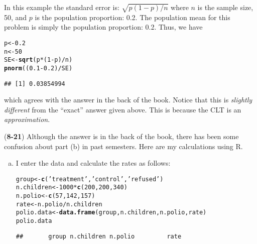 \documentclass[addpoints,12pt]{exam}\usepackage[]{graphicx}\usepackage[]{color}
\makeatletter
\newcommand{\hlnum}[1]{\textcolor[rgb]{0.686,0.059,0.569}{#1}}%
\newcommand{\hlstr}[1]{\textcolor[rgb]{0.192,0.494,0.8}{#1}}%
\newcommand{\hlopt}[1]{\textcolor[rgb]{0,0,0}{#1}}%
\newcommand{\hlstd}[1]{\textcolor[rgb]{0.345,0.345,0.345}{#1}}%
\newcommand{\hlkwb}[1]{\textcolor[rgb]{0.69,0.353,0.396}{#1}}%
\newcommand{\hlkwd}[1]{\textcolor[rgb]{0.737,0.353,0.396}{\textbf{#1}}}%
\newenvironment{kframe}{%
 \def\at@end@of@kframe{}%
 \ifinner\ifhmode%
  \def\at@end@of@kframe{\end{minipage}}%
  \begin{minipage}{\columnwidth}%
 \fi\fi%
 \def\FrameCommand##1{\hskip\@totalleftmargin \hskip-\fboxsep
 \colorbox{shadecolor}{##1}\hskip-\fboxsep
     \hskip-\linewidth \hskip-\@totalleftmargin \hskip\columnwidth}%
 \MakeFramed {\advance\hsize-\width
   \@totalleftmargin\z@ \linewidth\hsize
   \@setminipage}}%
 {\par\unskip\endMakeFramed%
 \at@end@of@kframe}
\newenvironment{knitrout}{}{} %
\makeatother
\begin{document}
\begin{questions}
\begin{solution}
In this example the standard error is: $\sqrt{p(1-p)/n}$ where $n$ is the sample size, 50, and $p$ is the population proportion: 0.2. The population mean for this problem is simply the population proportion: 0.2. Thus, we have
\begin{knitrout}
\color{fgcolor}\begin{kframe}
\begin{alltt}
\hlstd{p} \hlkwb{<-} \hlnum{0.2}
\hlstd{n} \hlkwb{<-} \hlnum{50}
\hlstd{SE} \hlkwb{<-} \hlkwd{sqrt}\hlstd{(p} \hlopt{*} \hlstd{(}\hlnum{1} \hlopt{-} \hlstd{p)} \hlopt{/} \hlstd{n)}
\hlkwd{pnorm}\hlstd{((}\hlnum{0.1} \hlopt{-} \hlnum{0.2}\hlstd{)}\hlopt{/}\hlstd{SE)}
\end{alltt}
\begin{verbatim}
## [1] 0.03854994
\end{verbatim}
\end{kframe}
\end{knitrout}
which agrees with the answer in the back of the book. Notice that this is \emph{slightly different} from the ``exact'' answer given above. This is because the CLT is an \emph{approximation}. 
  \end{solution}
	\item[]
		\begin{solution} (\textbf{8-21}) Although the answer is in the back of the book, there has been some confusion about part (b) in past semesters. Here are my calculations using R. 
  \begin{enumerate}[(a)]
    \item I enter the data and calculate the rates as follows:
\begin{knitrout}
\color{fgcolor}\begin{kframe}
\begin{alltt}
\hlstd{group} \hlkwb{<-} \hlkwd{c}\hlstd{(}\hlstr{'treatment'}\hlstd{,} \hlstr{'control'}\hlstd{,} \hlstr{'refused'}\hlstd{)}
\hlstd{n.children} \hlkwb{<-} \hlnum{1000} \hlopt{*} \hlkwd{c}\hlstd{(}\hlnum{200}\hlstd{,} \hlnum{200}\hlstd{,} \hlnum{340}\hlstd{)}
\hlstd{n.polio} \hlkwb{<-} \hlkwd{c}\hlstd{(}\hlnum{57}\hlstd{,} \hlnum{142}\hlstd{,} \hlnum{157}\hlstd{)}
\hlstd{rate} \hlkwb{<-} \hlstd{n.polio}\hlopt{/}\hlstd{n.children}
\hlstd{polio.data} \hlkwb{<-} \hlkwd{data.frame}\hlstd{(group, n.children, n.polio, rate)}
\hlstd{polio.data}
\end{alltt}
\begin{verbatim}
##       group n.children n.polio         rate

\end{verbatim}
\end{kframe}
\end{knitrout}
\end{enumerate}
\end{solution}
\end{questions}
\end{document}
